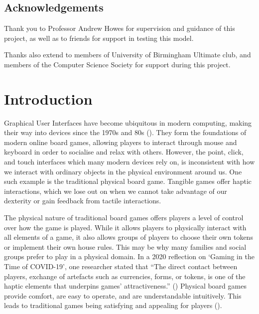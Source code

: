 \documentclass[12pt]{article}
\begin{document}
\subsection{Acknowledgements}
Thank you to Professor Andrew Howes for supervision and guidance of this project, as well as to friends for support in testing this model. 

Thanks also extend to members of University of Birmingham Ultimate club, and members of the Computer Science Society for support during this project.


\section{Introduction}


Graphical User Interfaces have become ubiquitous in modern computing, making their way into devices since the 1970s and 80s (\cite{ishii2008tangible}).
They form the foundations of modern online board games, allowing players to interact through mouse and keyboard in order to socialise and relax with others. 
However, the point, click, and touch interfaces which many modern devices rely on, is inconsistent with how we interact with ordinary objects in the physical environment around us. 
One such example is the traditional physical board game. 
Tangible games offer haptic interactions, which we lose out on when we cannot take advantage of our dexterity or gain feedback from tactile interactions. 

The physical nature of traditional board games offers players a level of control over how the game is played. 
While it allows players to physically interact with all elements of a game, it also allows groups of players to choose their own tokens or implement their own house rules. 
This may be why many families and social groups prefer to play in a physical domain. 
In a 2020 reflection on ‘Gaming in the Time of COVID-19’, one researcher stated that “The direct contact between players, exchange of artefacts such as currencies, forms, or tokens, is one of the haptic elements that underpins games’ attractiveness.” (\cite{kriz2020gaming})
Physical board games provide comfort, are easy to operate, and are understandable intuitively.
This leads to traditional games being satisfying and appealing for players (\cite{fang2016emotional}). 
\end{document}
